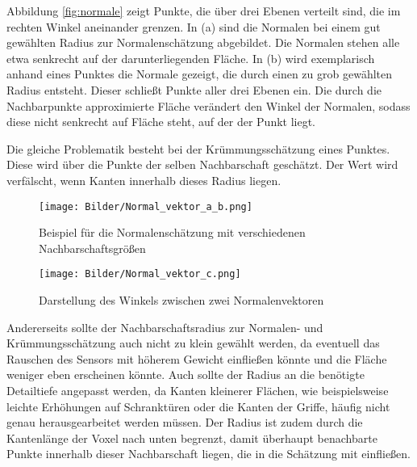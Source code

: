 Abbildung \ref{fig:normale} zeigt Punkte, die über drei Ebenen verteilt sind, die im rechten Winkel aneinander grenzen. In (a) sind die Normalen bei einem gut gewählten Radius zur Normalenschätzung abgebildet. Die Normalen stehen alle etwa senkrecht auf der darunterliegenden Fläche. In (b) wird exemplarisch anhand eines Punktes die Normale gezeigt, die durch einen zu grob gewählten Radius entsteht. Dieser schließt Punkte aller drei Ebenen ein. Die durch die Nachbarpunkte approximierte Fläche verändert den Winkel der Normalen, sodass diese nicht senkrecht auf Fläche steht, auf der der Punkt liegt. 

Die gleiche Problematik besteht bei der Krümmungsschätzung eines Punktes. Diese wird über die Punkte der selben Nachbarschaft geschätzt. Der Wert wird verfälscht, wenn Kanten innerhalb dieses Radius liegen. 
 

\begin{figure}[htb]
	\centering
	\begin{minipage}[t]{0.6\linewidth}
		\centering
		\texttt{[image: Bilder/Normal\_vektor\_a\_b.png]}
		\caption{Beispiel für die Normalenschätzung mit verschiedenen Nachbarschaftsgrößen}
		\label{fig:normale}
	\end{minipage}
	\hfill
	\begin {minipage}[t]{0.3\linewidth}
		\centering
		\texttt{[image: Bilder/Normal\_vektor\_c.png]}
		\caption{Darstellung des Winkels zwischen zwei Normalenvektoren}
		\label{fig:winkel_normale}
	\end{minipage}
\end{figure}

Andererseits sollte der Nachbarschaftsradius zur Normalen- und Krümmungsschätzung auch nicht zu klein gewählt werden, da eventuell das Rauschen des Sensors mit höherem Gewicht einfließen könnte und die Fläche weniger eben erscheinen könnte. Auch sollte der Radius an die benötigte Detailtiefe angepasst werden, da Kanten kleinerer Flächen, wie beispielsweise leichte Erhöhungen auf Schranktüren oder die Kanten der Griffe, häufig nicht genau herausgearbeitet werden müssen. Der Radius ist zudem durch die Kantenlänge der Voxel nach unten begrenzt, damit überhaupt benachbarte Punkte innerhalb dieser Nachbarschaft liegen, die in die Schätzung mit einfließen.

